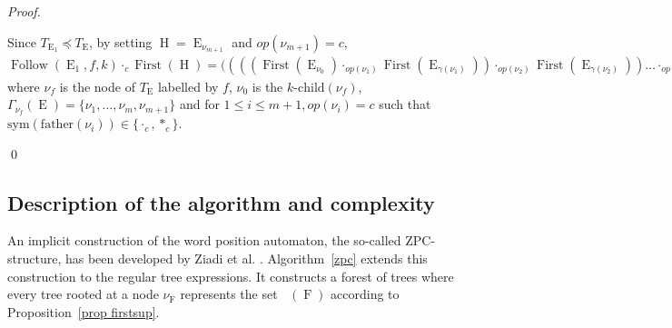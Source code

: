 \documentclass{llncs}
\DeclareMathOperator{\First}{First}
\DeclareMathOperator{\Follow}{Follow}
\DeclareMathOperator{\E}{E}
\DeclareMathOperator{\h}{H}
\DeclareMathOperator{\f}{F}
\DeclareMathOperator{\Fir}{Fr_>}
\def\firstt#1{\Fir{(#1)}}
\begin{document}
\begin{proof}
\begin{sloppy}
\begin{enumerate}
    Since $T_{\E_1} \preccurlyeq T_{\E}$, by setting $\h=\E_{\nu_{m+1}}$ and $op(\nu_{m+1})=c$, $\Follow(\E_1,f,k)\cdot_c \First(\h)=((((\First(\E_{\nu_0}) \cdot_{op(\nu_1)} \First(\E_{\gamma(\nu_1)})) \cdot_{op(\nu_2)} \First(\E_{\gamma(\nu_2)})) \dots \cdot_{op(\nu_{m})} \First(\E_{\gamma(\nu_m)})) \cdot_{op(\nu_{m+1})} \First(\E_{\gamma(\nu_{m+1})})$ where $\nu_f$ is the node of $T_{\E}$ labelled by $f$, $\nu_0$ is the $k\mbox{-}\mathrm{child}(\nu_{f})$, $\Gamma_{\nu_{f}}(\E)=\{\nu_1, \dots,\nu_m,\nu_{m+1}\}$ and for $1\leq i\leq m+1,op(\nu_i)=c$ such that $\mathrm{sym}(\mathrm{father}(\nu_i)) \in \{\cdot_c,{*_c}\}$.
  \end{enumerate}
\end{sloppy}  
  \qed
\end{proof}

\subsection{Description of the algorithm and complexity}

An implicit construction of the word position automaton, the so-called ZPC-structure, has been developed by Ziadi et al. \cite{ZPC96,ZPC}.
Algorithm~\ref{zpc} extends this construction to the regular tree expressions. It constructs
a forest of trees where every tree rooted at a node $\nu_{\f}$ represents the set $\firstt{\f}$ according to Proposition~\ref{prop firstsup}. 
\end{document}
